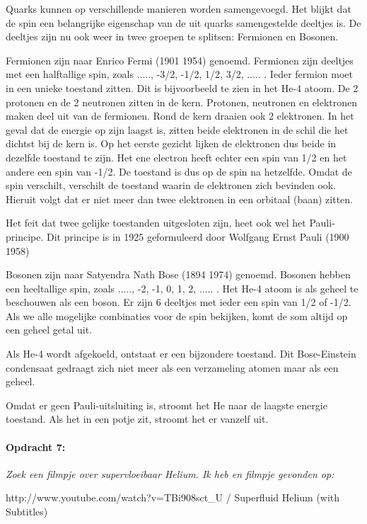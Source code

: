 Quarks kunnen op verschillende manieren worden samengevoegd. Het blijkt
dat de spin een belangrijke eigenschap van de uit quarks samengestelde
deeltjes is. De deeltjes zijn nu ook weer in twee groepen te splitsen:
Fermionen en Bosonen.

Fermionen zijn naar Enrico Fermi (1901 \textendash{} 1954) genoemd.
Fermionen zijn deeltjes met een halftallige spin, zoals ....., -3/2,
-1/2, 1/2, 3/2, ..... . Ieder fermion moet in een unieke toestand
zitten. Dit is bijvoorbeeld te zien in het He-4 atoom. De 2 protonen
en de 2 neutronen zitten in de kern. Protonen, neutronen en elektronen
maken deel uit van de fermionen. Rond de kern draaien ook 2 elektronen.
In het geval dat de energie op zijn laagst is, zitten beide elektronen
in de schil die het dichtst bij de kern is. Op het eerste gezicht
lijken de elektronen dus beide in dezelfde toestand te zijn. Het ene
electron heeft echter een spin van 1/2 en het andere een spin van
-1/2. De toestand is dus op de spin na hetzelfde. Omdat de spin verschilt,
verschilt de toestand waarin de elektronen zich bevinden ook. Hieruit
volgt dat er niet meer dan twee elektronen in een orbitaal (baan)
zitten.

Het feit dat twee gelijke toestanden uitgesloten zijn, heet ook wel
het Pauli-principe. Dit principe is in 1925 geformuleerd door Wolfgang
Ernst Pauli (1900 \textendash{} 1958)

Bosonen zijn naar Satyendra Nath Bose (1894 \textendash{} 1974) genoemd.
Bosonen hebben een heeltallige spin, zoals ....., -2, -1, 0, 1, 2,
..... . Het He-4 atoom is als geheel te beschouwen als een boson.
Er zijn 6 deeltjes met ieder een spin van 1/2 of -1/2. Als we alle
mogelijke combinaties voor de spin bekijken, komt de som altijd op
een geheel getal uit. 

Als He-4 wordt afgekoeld, ontstaat er een bijzondere toestand. Dit
Bose-Einstein condensaat gedraagt zich niet meer als een verzameling
atomen maar als een geheel.

Omdat er geen Pauli-uitsluiting is, stroomt het He naar de laagste
energie toestand. Als het in een potje zit, stroomt het er vanzelf
uit.


\paragraph*{Opdracht 7:}

\emph{Zoek een filmpje over supervloeibaar Helium. Ik heb en filmpje
gevonden op:}

http://www.youtube.com/watch?v=TBi908sct\_U / Superfluid
Helium (with Subtitles)



